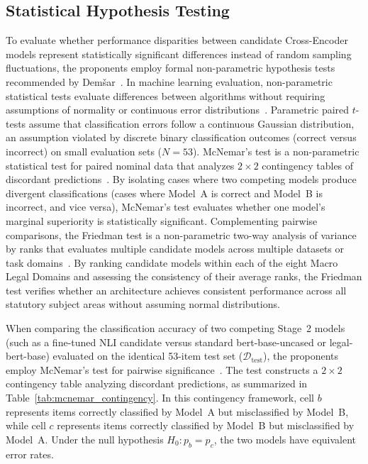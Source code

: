     \subsection{Statistical Hypothesis Testing}
    \label{sec:statistical_comparisons}
    To evaluate whether performance disparities between candidate Cross-Encoder models represent statistically significant differences instead of random sampling fluctuations, the proponents employ formal non-parametric hypothesis tests recommended by Dem{\v{s}}ar~\cite{demsar2006statistical}. In machine learning evaluation, non-parametric statistical tests evaluate differences between algorithms without requiring assumptions of normality or continuous error distributions~\cite{demsar2006statistical}. Parametric paired $t$-tests assume that classification errors follow a continuous Gaussian distribution, an assumption violated by discrete binary classification outcomes (correct versus incorrect) on small evaluation sets ($N = 53$). McNemar's test is a non-parametric statistical test for paired nominal data that analyzes $2 \times 2$ contingency tables of discordant predictions~\cite{mcnemar1947note}. By isolating cases where two competing models produce divergent classifications (cases where Model~A is correct and Model~B is incorrect, and vice versa), McNemar's test evaluates whether one model's marginal superiority is statistically significant. Complementing pairwise comparisons, the Friedman test is a non-parametric two-way analysis of variance by ranks that evaluates multiple candidate models across multiple datasets or task domains~\cite{friedman1937use}. By ranking candidate models within each of the eight Macro Legal Domains and assessing the consistency of their average ranks, the Friedman test verifies whether an architecture achieves consistent performance across all statutory subject areas without assuming normal distributions.

    When comparing the classification accuracy of two competing Stage~2 models (such as a fine-tuned NLI candidate versus standard bert-base-uncased or legal-bert-base) evaluated on the identical 53-item test set ($\mathcal{D}_{\text{test}}$), the proponents employ McNemar's test for pairwise significance~\cite{mcnemar1947note}. The test constructs a $2 \times 2$ contingency table analyzing discordant predictions, as summarized in Table~\ref{tab:mcnemar_contingency}. In this contingency framework, cell $b$ represents items correctly classified by Model~A but misclassified by Model~B, while cell $c$ represents items correctly classified by Model~B but misclassified by Model~A. Under the null hypothesis $H_0: p_b = p_c$, the two models have equivalent error rates.

